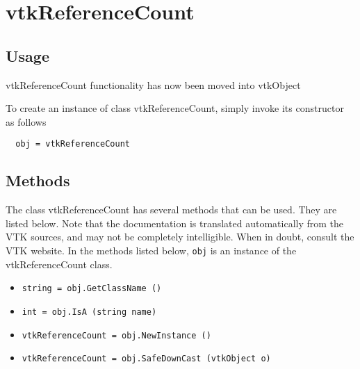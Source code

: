 \section{vtkReferenceCount}

\subsection{Usage}

 vtkReferenceCount functionality has now been moved into vtkObject

To create an instance of class vtkReferenceCount, simply
invoke its constructor as follows
\begin{verbatim}
  obj = vtkReferenceCount
\end{verbatim}
\subsection{Methods}

The class vtkReferenceCount has several methods that can be used.
  They are listed below.
Note that the documentation is translated automatically from the VTK sources,
and may not be completely intelligible.  When in doubt, consult the VTK website.
In the methods listed below, \verb|obj| is an instance of the vtkReferenceCount class.
\begin{itemize}
\item  \verb|string = obj.GetClassName ()|

\item  \verb|int = obj.IsA (string name)|

\item  \verb|vtkReferenceCount = obj.NewInstance ()|

\item  \verb|vtkReferenceCount = obj.SafeDownCast (vtkObject o)|

\end{itemize}
